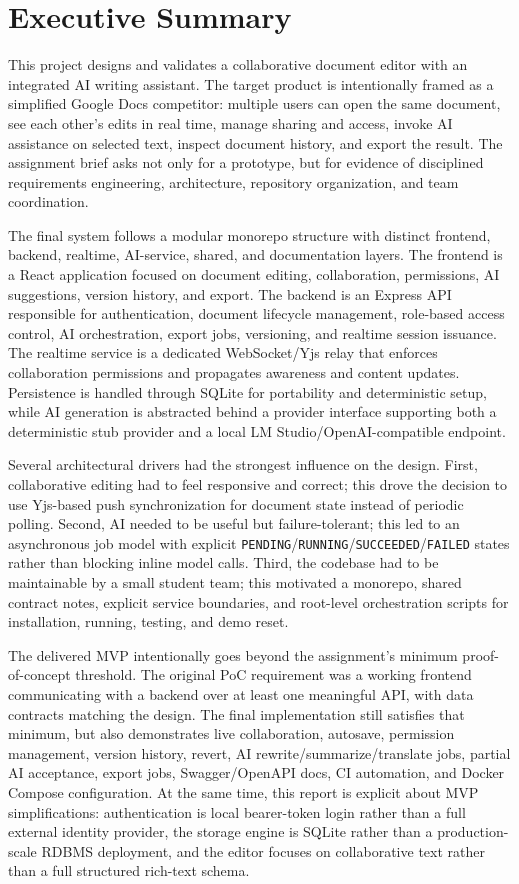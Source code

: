 \chapter{Executive Summary}

This project designs and validates a collaborative document editor with an integrated AI writing
assistant. The target product is intentionally framed as a simplified Google Docs competitor: multiple
users can open the same document, see each other's edits in real time, manage sharing and access,
invoke AI assistance on selected text, inspect document history, and export the result. The assignment
brief asks not only for a prototype, but for evidence of disciplined requirements engineering,
architecture, repository organization, and team coordination.

The final system follows a modular monorepo structure with distinct frontend, backend, realtime,
AI-service, shared, and documentation layers. The frontend is a React application focused on document
editing, collaboration, permissions, AI suggestions, version history, and export. The backend is an
Express API responsible for authentication, document lifecycle management, role-based access control,
AI orchestration, export jobs, versioning, and realtime session issuance. The realtime service is a
dedicated WebSocket/Yjs relay that enforces collaboration permissions and propagates awareness and
content updates. Persistence is handled through SQLite for portability and deterministic setup, while
AI generation is abstracted behind a provider interface supporting both a deterministic stub provider
and a local LM Studio/OpenAI-compatible endpoint.

Several architectural drivers had the strongest influence on the design. First, collaborative editing
had to feel responsive and correct; this drove the decision to use Yjs-based push synchronization for
document state instead of periodic polling. Second, AI needed to be useful but failure-tolerant; this
led to an asynchronous job model with explicit \texttt{PENDING}/\texttt{RUNNING}/\texttt{SUCCEEDED}/\texttt{FAILED}
states rather than blocking inline model calls. Third, the codebase had to be maintainable by a small
student team; this motivated a monorepo, shared contract notes, explicit service boundaries, and
root-level orchestration scripts for installation, running, testing, and demo reset.

The delivered MVP intentionally goes beyond the assignment's minimum proof-of-concept threshold.
The original PoC requirement was a working frontend communicating with a backend over at least one
meaningful API, with data contracts matching the design. The final implementation still satisfies that
minimum, but also demonstrates live collaboration, autosave, permission management, version history,
revert, AI rewrite/summarize/translate jobs, partial AI acceptance, export jobs, Swagger/OpenAPI
docs, CI automation, and Docker Compose configuration. At the same time, this report is explicit about
MVP simplifications: authentication is local bearer-token login rather than a full external identity
provider, the storage engine is SQLite rather than a production-scale RDBMS deployment, and the editor
focuses on collaborative text rather than a full structured rich-text schema.

